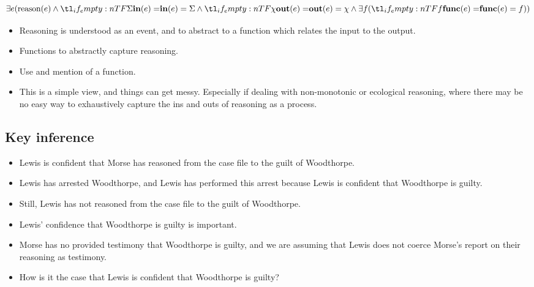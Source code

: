 \documentclass[10pt]{article}
\newcommand{\hozlinedash}[0]{%
  \noindent\hdashrule[0.5ex][c]{\textwidth}{.1pt}{2.5pt}
}
\begin{document}
\[
  \exists e(\text{reason}(e) \land \ein{\Sigma} \land \eout{\chi} \land \exists f(\efunc{f}))
\]

\begin{itemize}
\item Reasoning is understood as an event, and to abstract to a function which relates the input to the output.
\item Functions to abstractly capture reasoning.
\item Use and mention of a function.
\end{itemize}

\hozlinedash

\begin{itemize}
\item This is a simple view, and things can get messy.
  Especially if dealing with non-monotonic or ecological reasoning, where there may be no easy way to exhaustively capture the ins and outs of reasoning as a process.
\end{itemize}

\hozlinedash

\subsection{Key inference}
\label{sec:key-inference}

\begin{itemize}
\item Lewis is confident that Morse has reasoned from the case file to the guilt of Woodthorpe.
\item Lewis has arrested Woodthorpe, and Lewis has performed this arrest because Lewis is confident that Woodthorpe is guilty.
\item Still, Lewis has not reasoned from the case file to the guilt of Woodthorpe.
\end{itemize}

\begin{itemize}
\item Lewis' confidence that Woodthorpe is guilty is important.
\item Morse has no provided testimony that Woodthorpe is guilty, and we are assuming that Lewis does not coerce Morse's report on their reasoning as testimony.
\end{itemize}

\begin{itemize}
\item How is it the case that Lewis is confident that Woodthorpe is guilty?
\end{itemize}
\end{document}
